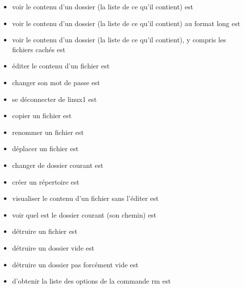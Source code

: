 \documentclass[11pt,a4paper]{article}
\begin{document}
					\begin{itemize}
				
			\item voir le contenu d'un dossier (la liste de ce qu'il contient) est  \textcolor{gray}{\underline{\hspace*{2em}}} 
			\item voir le contenu d'un dossier (la liste de ce qu'il contient) au format long est  \textcolor{gray}{\underline{\hspace*{3em}}} 
			\item voir le contenu d'un dossier (la liste de ce qu'il contient), y compris les fichiers cach\'es est  \textcolor{gray}{\underline{\hspace*{3em}}} 
			\item \'editer le contenu d'un fichier est  \textcolor{gray}{\underline{\hspace*{3em}}} 
			\item changer son mot de passe est  \textcolor{gray}{\underline{\hspace*{5em}}} 
			\item se d\'econnecter de linux1 est  \textcolor{gray}{\underline{\hspace*{3em}}} 
			\item copier un fichier est  \textcolor{gray}{\underline{\hspace*{2em}}} 
			\item renommer un fichier est  \textcolor{gray}{\underline{\hspace*{2em}}} 
			\item d\'eplacer un fichier est  \textcolor{gray}{\underline{\hspace*{2em}}} 
			\item changer de dossier courant est  \textcolor{gray}{\underline{\hspace*{2em}}} 
			\item cr\'eer un r\'epertoire est  \textcolor{gray}{\underline{\hspace*{3em}}} 
			\item visualiser le contenu d'un fichier sans l'\'editer est  \textcolor{gray}{\underline{\hspace*{2em}}} 
			\item voir quel est le dossier courant (son chemin) est  \textcolor{gray}{\underline{\hspace*{2em}}} 
			\item d\'etruire un fichier est  \textcolor{gray}{\underline{\hspace*{2em}}} 
			\item d\'etruire un dossier vide est  \textcolor{gray}{\underline{\hspace*{3em}}} 
			\item d\'etruire un dossier pas forc\'ement vide est  \textcolor{gray}{\underline{\hspace*{3em}}} 
			\item d'obtenir la liste des options de la commande rm est  \textcolor{gray}{\underline{\hspace*{5em}}} 
					\end{itemize}
				
\end{document}
